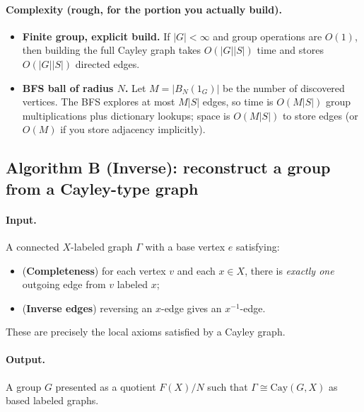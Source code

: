 \documentclass[11pt]{article}
\theoremstyle{definition}
\theoremstyle{plain}
\theoremstyle{remark}
\newcommand{\Cay}{\mathrm{Cay}}
\begin{document}
\paragraph{Complexity (rough, for the portion you actually build).}\cite{cormen2009}
\begin{itemize}[leftmargin=2em]
\item \textbf{Finite group, explicit build.} If $|G|<\infty$ and group operations are $O(1)$, then building the full Cayley graph takes $O(|G||S|)$ time and stores $O(|G||S|)$ directed edges.
\item \textbf{BFS ball of radius $N$.} Let $M=|B_N(1_G)|$ be the number of discovered vertices. The BFS explores at most $M|S|$ edges, so time is $O(M|S|)$ group multiplications plus dictionary lookups; space is $O(M|S|)$ to store edges (or $O(M)$ if you store adjacency implicitly).
\end{itemize}

\subsection*{Algorithm B (Inverse): reconstruct a group from a Cayley-type graph}\cite{cayley1878,cormen2009}
\paragraph{Input.}
A connected $X$-labeled graph $\Gamma$ with a base vertex $e$ satisfying:
\begin{itemize}[leftmargin=2em]
\item (\textbf{Completeness}) for each vertex $v$ and each $x\in X$, there is \emph{exactly one} outgoing edge from $v$ labeled $x$;
\item (\textbf{Inverse edges}) reversing an $x$-edge gives an $x^{-1}$-edge.
\end{itemize}
These are precisely the local axioms satisfied by a Cayley graph.

\paragraph{Output.}
A group $G$ presented as a quotient $F(X)/N$ such that $\Gamma\cong\Cay(G,X)$ as based labeled graphs.
\end{document}
